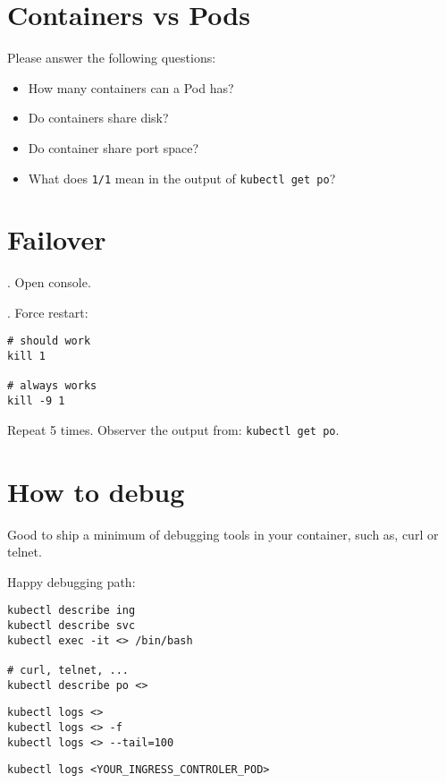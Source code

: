 \documentclass[12pt, letterpaper]{article}
\begin{document}
\section{Containers vs Pods}
Please answer the following questions:
\begin{itemize}
\item How many containers can a Pod has?
\item Do containers share disk?
\item Do container share port space?
\item What does \verb|1/1| mean in the output of \verb|kubectl get po|?
\end{itemize}

\bigskip
\bigskip

\section{Failover}

. Open console.

. Force restart:

\begin{verbatim}
# should work
kill 1

# always works
kill -9 1
\end{verbatim}

Repeat 5 times. Observer the output from: \verb|kubectl get po|.

%
%
%
\section{How to debug}

Good to ship a minimum of debugging tools in your container, such as, curl or telnet.

Happy debugging path:

\begin{verbatim}
kubectl describe ing
kubectl describe svc
kubectl exec -it <> /bin/bash

# curl, telnet, ...
kubectl describe po <>
\end{verbatim}

\begin{verbatim}
kubectl logs <>
kubectl logs <> -f
kubectl logs <> --tail=100
\end{verbatim}

\begin{verbatim}
kubectl logs <YOUR_INGRESS_CONTROLER_POD>
\end{verbatim}
\end{document}
